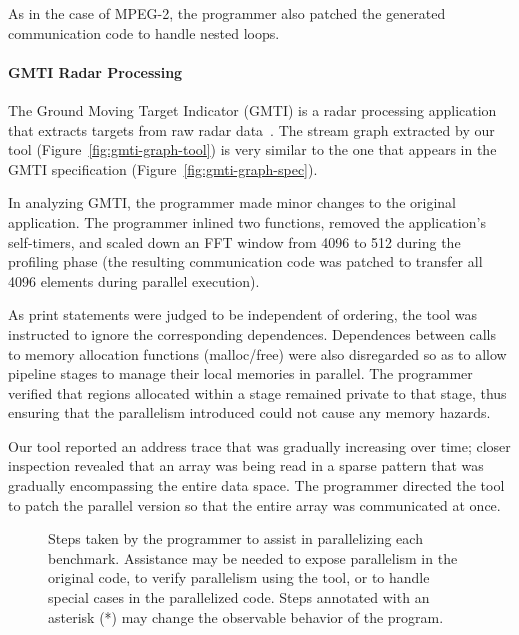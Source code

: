As in the case of MPEG-2, the programmer also patched the generated
communication code to handle nested loops.

\paragraph*{GMTI Radar Processing} The Ground Moving Target Indicator (GMTI)
is a radar processing application that extracts targets from raw radar
data~\cite{reuther03gmti}.  The stream graph extracted by our tool
(Figure~\ref{fig:gmti-graph-tool}) is very similar to the one that
appears in the GMTI specification (Figure~\ref{fig:gmti-graph-spec}).

In analyzing GMTI, the programmer made minor changes to the original
application.  The programmer inlined two functions, removed the
application's self-timers, and scaled down an FFT window from 4096 to
512 during the profiling phase (the resulting communication code was
patched to transfer all 4096 elements during parallel execution).  

As print statements were judged to be independent of ordering, the
tool was instructed to ignore the corresponding dependences.
Dependences between calls to memory allocation functions (malloc/free)
were also disregarded so as to allow pipeline stages to manage their
local memories in parallel.  The programmer verified that regions
allocated within a stage remained private to that stage, thus ensuring
that the parallelism introduced could not cause any memory hazards.

Our tool reported an address trace that was gradually increasing over
time; closer inspection revealed that an array was being read in a
sparse pattern that was gradually encompassing the entire data space.
The programmer directed the tool to patch the parallel version so that
the entire array was communicated at once.

\begin{figure*}[t]
\hspace{-0.25in}
\caption[Steps taken by programmer to assist with
  parallelization.]{Steps taken by the programmer to assist in
  parallelizing each benchmark.  Assistance may be needed to expose
  parallelism in the original code, to verify parallelism using the
  tool, or to handle special cases in the parallelized code.  Steps
  annotated with an asterisk (*) may change the observable behavior of
  the program\protect\footnotemark[1].
  \protect\label{fig:program-changes}}
\end{figure*}

